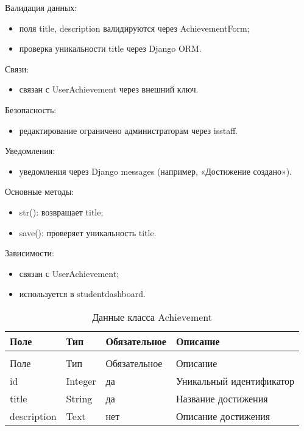 Валидация данных:
	\begin{itemize}
		\item поля title, description валидируются через AchievementForm;
		\item проверка уникальности title через Django ORM.
	\end{itemize}
	
Связи:
	\begin{itemize}
		\item связан с UserAchievement через внешний ключ.
	\end{itemize}
	
Безопасность:
	\begin{itemize}
		\item редактирование ограничено администраторам через isstaff.
	\end{itemize}
	
Уведомления:
	\begin{itemize}
		\item уведомления через Django messages (например, «Достижение создано»).
	\end{itemize}
	
Основные методы:
	\begin{itemize}
		\item str(): возвращает title;
		\item save(): проверяет уникальность title.
	\end{itemize}
	
Зависимости:
	\begin{itemize}
		\item связан с UserAchievement;
		\item используется в studentdashboard.
	\end{itemize}


\begin{xltabular}{\textwidth}{|l|l|l|X|}
	\caption{Данные класса Achievement\label{tab:achievement_attributes}}\\
	\hline
	Поле & Тип & Обязательное & Описание \\ \hline
	\endfirsthead
	\\
	\hline
	Поле & Тип & Обязательное & Описание \\ \hline
	\endhead
	id & Integer & да & Уникальный идентификатор \\ \hline
	title & String & да & Название достижения \\ \hline
	description & Text & нет & Описание достижения \\ \hline
\end{xltabular}

